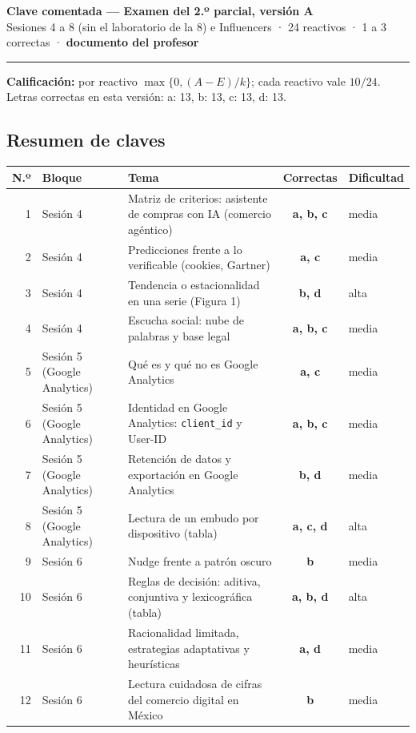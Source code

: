 \documentclass[10pt,letterpaper]{article}
\begin{document}
{\color{guinda}\large\textbf{Clave comentada — Examen del 2.º parcial, versión A}}\\
{\small Sesiones 4 a 8 (sin el laboratorio de la 8) e Influencers · 24 reactivos · 1 a 3 correctas · \textbf{documento del profesor}}
\vspace{4pt}\hrule\vspace{4pt}
\textbf{Calificación:} por reactivo $\max\{0,(A-E)/k\}$; cada reactivo vale $10/24$. Letras correctas en esta versión: a: 13, b: 13, c: 13, d: 13.
\subsection*{Resumen de claves}\begin{center}\footnotesize\begin{tabular}{@{}rllcl@{}}\toprule N.º & Bloque & Tema & Correctas & Dificultad\\\midrule
1 & Sesión 4 & Matriz de criterios: asistente de compras con IA (comercio agéntico) & \textbf{a, b, c} & media\\
2 & Sesión 4 & Predicciones frente a lo verificable (cookies, Gartner) & \textbf{a, c} & media\\
3 & Sesión 4 & Tendencia o estacionalidad en una serie (Figura 1) & \textbf{b, d} & alta\\
4 & Sesión 4 & Escucha social: nube de palabras y base legal & \textbf{a, b, c} & media\\
5 & Sesión 5 (Google Analytics) & Qué es y qué no es Google Analytics & \textbf{a, c} & media\\
6 & Sesión 5 (Google Analytics) & Identidad en Google Analytics: \texttt{client\_id} y User-ID & \textbf{a, b, c} & media\\
7 & Sesión 5 (Google Analytics) & Retención de datos y exportación en Google Analytics & \textbf{b, d} & media\\
8 & Sesión 5 (Google Analytics) & Lectura de un embudo por dispositivo (tabla) & \textbf{a, c, d} & alta\\
9 & Sesión 6 & Nudge frente a patrón oscuro & \textbf{b} & media\\
10 & Sesión 6 & Reglas de decisión: aditiva, conjuntiva y lexicográfica (tabla) & \textbf{a, b, d} & alta\\
11 & Sesión 6 & Racionalidad limitada, estrategias adaptativas y heurísticas & \textbf{a, d} & media\\
12 & Sesión 6 & Lectura cuidadosa de cifras del comercio digital en México & \textbf{b} & media\\

\end{tabular}
\end{center}
\end{document}
